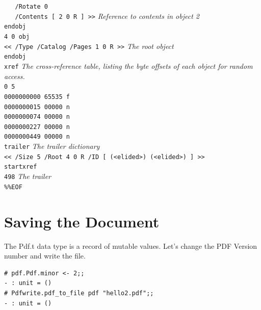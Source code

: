 \documentclass[a4paper]{memoir}
\begin{document}
\begin{framed}
\noindent\small\verb!   /Rotate 0!\\
\noindent\small\verb!   /Contents [ 2 0 R ] >>! \textit{Reference to contents in object 2}\\
\noindent\small\verb!endobj!\\
\noindent\small\verb!4 0 obj!\\
\noindent\small\verb!<< /Type /Catalog /Pages 1 0 R >>! \textit{The root object}\\
\noindent\small\verb!endobj!\\
\noindent\small\verb!xref! \textit{The cross-reference table, listing the byte offsets of each object for random access.}\\
\noindent\small\verb!0 5 !\\
\noindent\small\verb!0000000000 65535 f !\\
\noindent\small\verb!0000000015 00000 n !\\
\noindent\small\verb!0000000074 00000 n !\\
\noindent\small\verb!0000000227 00000 n !\\
\noindent\small\verb!0000000449 00000 n !\\
\noindent\small\verb!trailer! \textit{The trailer dictionary}\\
\noindent\small\verb!<< /Size 5 /Root 4 0 R /ID [ (<elided>) (<elided>) ] >>!\\
\noindent\small\verb!startxref!\\
\noindent\small\verb!498! \textit{The trailer}\\
\noindent\small\verb!%%EOF!\\
\end{framed}

\clearpage

\section*{Saving the Document}
The \textsf{Pdf.t} data type is a record of mutable values. Let's change the PDF Version number and write the file.
\begin{framed}
\begin{verbatim}
# pdf.Pdf.minor <- 2;;
- : unit = ()
# Pdfwrite.pdf_to_file pdf "hello2.pdf";;
- : unit = ()
\end{verbatim}
\end{framed}
\end{document}
